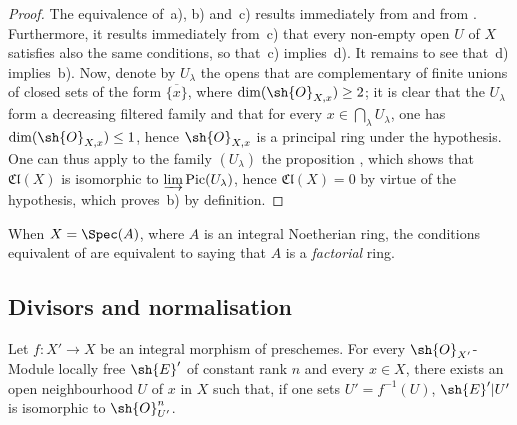 \begin{proof}
The equivalence of~a), b) and~c) results immediately from  and from .
Furthermore, it results immediately from~c) that every non-empty open $U$ of $X$ satisfies also the same conditions, so that~c) implies~d).
It remains to see that~d) implies~b).
Now, denote by $U_\lambda$ the opens that are complementary of finite unions of closed sets of the form $\overline{\{x\}}$, where $\dim(\sh{O}_{X,x})\geq 2$;
it is clear that the $U_\lambda$ form a decreasing filtered family and that for every $x\in\bigcap_\lambda U_\lambda$, one has $\dim(\sh{O}_{X,x})\leq 1$, hence $\sh{O}_{X,x}$ is a principal ring under the hypothesis.
One can thus apply to the family $(U_\lambda)$ the proposition , which shows that $\mathfrak{Cl}(X)$ is isomorphic to $\varinjlim\operatorname{Pic}(U_\lambda)$, hence $\mathfrak{Cl}(X)=0$ by virtue of the hypothesis, which proves~b) by definition.
\end{proof}

\begin{remark}[21.7.7]
\label{IV.21.7.7}
When $X=\Spec(A)$, where $A$ is an integral Noetherian ring, the conditions equivalent of  are equivalent to saying that $A$ is a \emph{factorial} ring.
\end{remark}

\subsection{Divisors and normalisation}
\label{IV.21.8}


\begin{lemma}[21.8.1]
\label{IV.21.8.1}
Let $f:X'\to X$ be an integral morphism of preschemes.
For every $\sh{O}_{X'}$-Module locally free $\sh{E}'$ of constant rank $n$ and every $x\in X$, there exists an open neighbourhood $U$ of $x$ in $X$ such that, if one sets $U'=f^{-1}(U)$, $\sh{E}'|U'$ is isomorphic to $\sh{O}_{U'}^n$.
\end{lemma}

